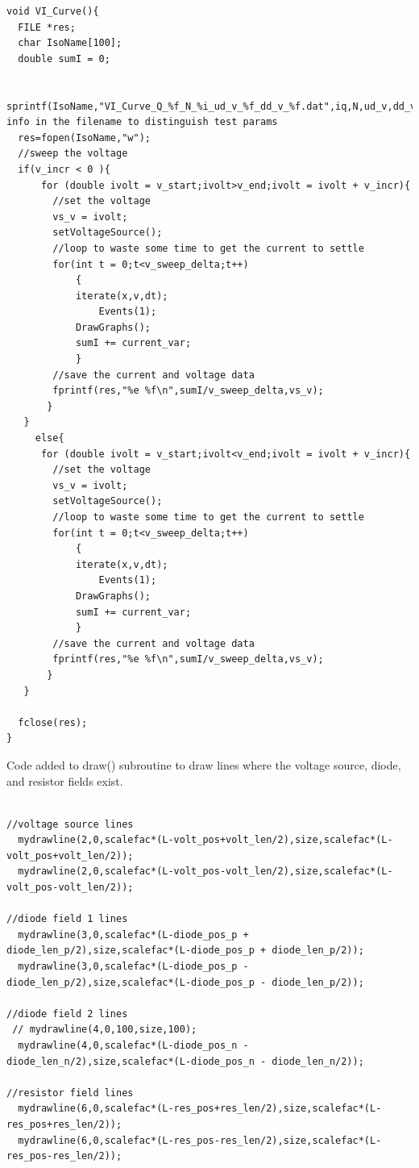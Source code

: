 \documentclass[a4paper]{article}
\begin{document}
\begin{verbatim}
void VI_Curve(){
  FILE *res;
  char IsoName[100];
  double sumI = 0;

  sprintf(IsoName,"VI_Curve_Q_%f_N_%i_ud_v_%f_dd_v_%f.dat",iq,N,ud_v,dd_v);//put info in the filename to distinguish test params
  res=fopen(IsoName,"w");
  //sweep the voltage
  if(v_incr < 0 ){
	  for (double ivolt = v_start;ivolt>v_end;ivolt = ivolt + v_incr){
		//set the voltage
		vs_v = ivolt;
		setVoltageSource();
		//loop to waste some time to get the current to settle
		for(int t = 0;t<v_sweep_delta;t++)
			{
			iterate(x,v,dt);
	       	 	Events(1);
			DrawGraphs();
			sumI += current_var;
			}
		//save the current and voltage data
		fprintf(res,"%e %f\n",sumI/v_sweep_delta,vs_v);
	   }
   }
     else{
	  for (double ivolt = v_start;ivolt<v_end;ivolt = ivolt + v_incr){
		//set the voltage
		vs_v = ivolt;
		setVoltageSource();
		//loop to waste some time to get the current to settle
		for(int t = 0;t<v_sweep_delta;t++)
			{
			iterate(x,v,dt);
	       	 	Events(1);
			DrawGraphs();
			sumI += current_var;
			}
		//save the current and voltage data
		fprintf(res,"%e %f\n",sumI/v_sweep_delta,vs_v);
	   }
   }

  fclose(res);
}

\end{verbatim}

Code added to draw() subroutine to draw lines where the voltage source, diode, and resistor fields exist.

\begin{verbatim}

//voltage source lines
  mydrawline(2,0,scalefac*(L-volt_pos+volt_len/2),size,scalefac*(L-volt_pos+volt_len/2));
  mydrawline(2,0,scalefac*(L-volt_pos-volt_len/2),size,scalefac*(L-volt_pos-volt_len/2));

//diode field 1 lines
  mydrawline(3,0,scalefac*(L-diode_pos_p + diode_len_p/2),size,scalefac*(L-diode_pos_p + diode_len_p/2));
  mydrawline(3,0,scalefac*(L-diode_pos_p - diode_len_p/2),size,scalefac*(L-diode_pos_p - diode_len_p/2));

//diode field 2 lines
 // mydrawline(4,0,100,size,100);
  mydrawline(4,0,scalefac*(L-diode_pos_n - diode_len_n/2),size,scalefac*(L-diode_pos_n - diode_len_n/2));

//resistor field lines
  mydrawline(6,0,scalefac*(L-res_pos+res_len/2),size,scalefac*(L-res_pos+res_len/2));
  mydrawline(6,0,scalefac*(L-res_pos-res_len/2),size,scalefac*(L-res_pos-res_len/2));

\end{verbatim}
\end{document}
